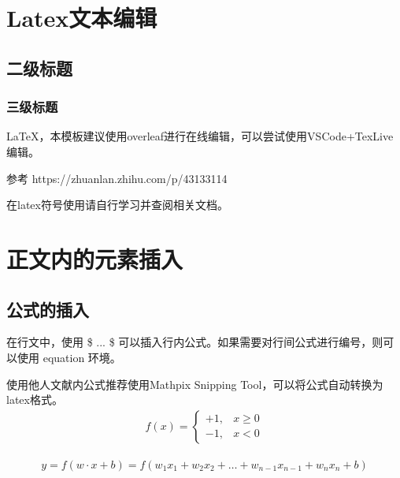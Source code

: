 \documentclass[a4paper,AutoFakeBold,oneside,12pt]{book}
\begin{document}
\blankmatter
  

\frontmatter\tableofcontents %


\newpage\mainmatter
{}


\chapter{Latex文本编辑}
\section{二级标题}
\subsection{三级标题}
\LaTeX，本模板建议使用overleaf进行在线编辑，可以尝试使用VSCode+TexLive编辑。

参考 https://zhuanlan.zhihu.com/p/43133114

在latex符号使用请自行学习并查阅相关文档。


\chapter{正文内的元素插入}
\section{公式的插入}
在行文中，使用 \$ ... \$ 可以插入行内公式。如果需要对行间公式进行编号，则可以使用 equation 环境。

使用他人文献内公式推荐使用Mathpix Snipping Tool，可以将公式自动转换为latex格式。
\begin{equation}
\begin{aligned}
f(x)=\left\{\begin{array}{ll}
+1, & x \geqslant 0 \\
-1, & x<0
\end{array}\right.
\end{aligned}
\end{equation}

\begin{equation}
\begin{aligned}
y=f(w \cdot x+b)=f\left(w_{1} x_{1}+w_{2} x_{2}+\dots+w_{n-1} x_{n-1}+w_{n} x_{n}+b\right)
\end{aligned}
\end{equation}
\end{document}
